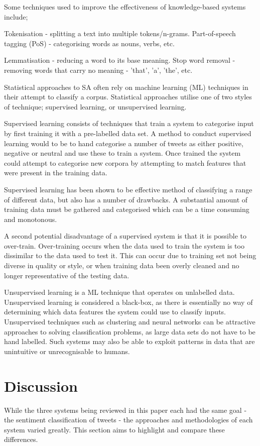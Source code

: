 \documentclass[twocolumn]{article}
\begin{document}
Some techniques used to improve the effectiveness of knowledge-based systems
include;

Tokenisation - splitting a text into multiple tokens/n-grams. 
Part-of-speech tagging (PoS) - categorising words as nouns, verbs, etc.

Lemmatisation - reducing a word to its base meaning.
Stop word removal - removing words that carry no meaning - 'that', 'a', 'the',
etc.

Statistical approaches to SA often rely on machine learning
(ML) techniques in their attempt to classify a corpus.
Statistical approaches utilise one of two styles of technique;
supervised learning, or unsupervised learning.

Supervised learning consists of techniques that train a system to categorise
input by first training it with a pre-labelled data set.
A method to conduct supervised learning would to be to hand categorise a
number of tweets as either positive, negative or neutral and use these to
train a system. 
Once trained the system could attempt to categorise new corpora
by attempting to match features that were present in the training data.

Supervised learning has been shown to be effective method of classifying a
range of different data, but also has a number of drawbacks. 
A substantial amount of training data must be gathered and categorised
which can be a time consuming and monotonous.

A second potential disadvantage of a supervised system is that it is possible to
over-train.
Over-training occurs when the data used to train the system is too dissimilar
to the data used to test it. 
This can occur due to training set not being diverse in quality or style, or
when training data been overly cleaned and no longer representative of
the testing data.

Unsupervised learning is a ML technique that operates on unlabelled data.
Unsupervised learning is considered a black-box, as there is essentially no
way of determining which data features the system could use to classify
inputs.
Unsupervised techniques such as clustering and neural networks can be
attractive approaches to solving classification problems, as large data sets
do not have to be hand labelled.
Such systems may also be able to exploit patterns in data that are unintuitive
or unrecognisable to humans.

\section{Discussion}
While the three systems being reviewed in this paper each had the same goal -
the sentiment classification of tweets - the approaches and methodologies of
each system varied greatly.  
This section aims to highlight and compare these differences.
\end{document}

